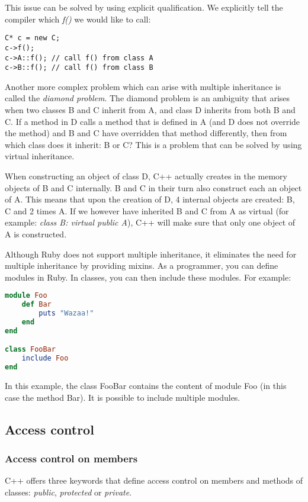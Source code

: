 \documentclass[10pt,a4paper,twocolumn]{article}
\begin{document}
This issue can be solved by using explicit qualification. We explicitly tell the compiler which \textit{f()} we would like to call:

\begin{lstlisting}
C* c = new C;
c->f();
c->A::f(); // call f() from class A
c->B::f(); // call f() from class B
\end{lstlisting}

Another more complex problem which can arise with multiple inheritance is called the \textit{diamond problem}. The diamond problem is an ambiguity that arises when two classes B and C inherit from A, and class D inherits from both B and C. If a method in D calls a method that is defined in A (and D does not override the method) and B and C have overridden that method differently, then from which class does it inherit: B or C? This is a problem that can be solved by using virtual inheritance.

When constructing an object of class D, C++ actually creates in the memory objects of B and C internally. B and C in their turn also construct each an object of A. This means that upon the creation of D, 4 internal objects are created: B, C and 2 times A. If we however have inherited B and C from A as virtual (for example: \textit{class B: virtual public A}), C++ will make sure that only one object of A is constructed.

Although Ruby does not support multiple inheritance, it eliminates the need for multiple inheritance by providing mixins. As a programmer, you can define modules in Ruby. In classes, you can then include these modules. For example:

\begin{lstlisting}[language=Ruby]
module Foo
	def Bar
		puts "Wazaa!"
	end
end

class FooBar
	include Foo
end
\end{lstlisting}

In this example, the class FooBar contains the content of module Foo (in this case the method Bar). It is possible to include multiple modules.

\subsection{Access control}

\subsubsection{Access control on members}
C++ offers three keywords that define access control on members and methods of classes: \textit{public}, \textit{protected} or \textit{private}. 
\end{document}
